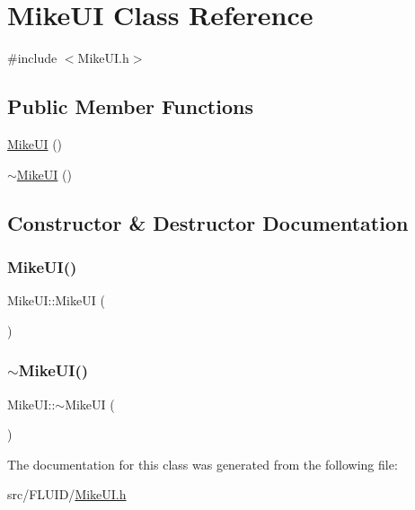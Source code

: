\hypertarget{class_mike_u_i}{}\section{Mike\+UI Class Reference}
\label{class_mike_u_i}


{\ttfamily \#include $<$Mike\+U\+I.\+h$>$}

\subsection*{Public Member Functions}
\begin{DoxyCompactItemize}
\item 
\hyperlink{class_mike_u_i_a8919b872efda1c51af76e7e461f16f5f}{Mike\+UI} ()
\item 
\hyperlink{class_mike_u_i_a492b2e08d03c9bb9b8c7ad5d54467bff}{$\sim$\+Mike\+UI} ()
\end{DoxyCompactItemize}


\subsection{Constructor \& Destructor Documentation}
\mbox{\label{class_mike_u_i_a8919b872efda1c51af76e7e461f16f5f}} 
\subsubsection{\texorpdfstring{Mike\+U\+I()}{MikeUI()}}
{\footnotesize\ttfamily Mike\+U\+I\+::\+Mike\+UI (\begin{DoxyParamCaption}{ }\end{DoxyParamCaption})}

\mbox{\label{class_mike_u_i_a492b2e08d03c9bb9b8c7ad5d54467bff}} 
\subsubsection{\texorpdfstring{$\sim$\+Mike\+U\+I()}{~MikeUI()}}
{\footnotesize\ttfamily Mike\+U\+I\+::$\sim$\+Mike\+UI (\begin{DoxyParamCaption}{ }\end{DoxyParamCaption})}



The documentation for this class was generated from the following file\+:\begin{DoxyCompactItemize}
\item 
src/\+F\+L\+U\+I\+D/\hyperlink{_mike_u_i_8h}{Mike\+U\+I.\+h}\end{DoxyCompactItemize}

